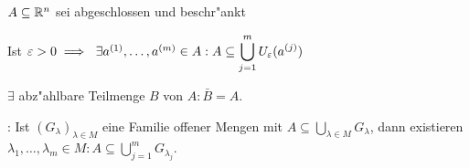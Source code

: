 \documentclass[a4paper,twoside,DIV15,BCOR12mm,chapterprefix=true,headings=twolinechapter]{scrbook}
\begin{document}
\begin{satz}[Überdeckungen]
$A \subseteq \mathbb{R}^n$ sei abgeschlossen und beschr"ankt
\begin{liste}
\item Ist $\varepsilon>0\implies\ \exists a^{(1)},\ldots,a^{(m)} \in A: A\subseteq \displaystyle\bigcup_{j=1}^m U_\varepsilon(a^{(j)})$
\item $\exists$ abz"ahlbare Teilmenge $B$ von $A: \bar B=A$.
\item {}: Ist $(G_\lambda)_{\lambda \in M}$ eine Familie offener Mengen mit $A \subseteq \displaystyle\bigcup_{\lambda \in M} G_\lambda$, dann existieren $\lambda_1, \ldots, \lambda_m \in M: A\subseteq \displaystyle\bigcup_{j=1}^m G_{\lambda_j}$.
\end{liste}
\end{satz}
\end{document}
